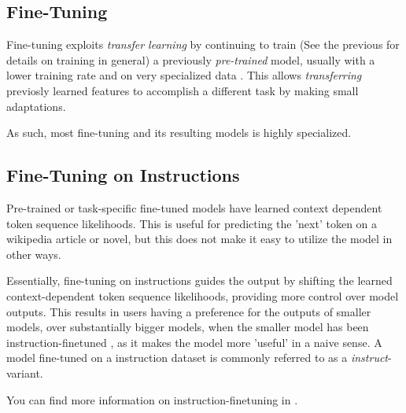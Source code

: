 \subsection{Fine-Tuning}\label{sub:finetune}
Fine-tuning exploits \textit{transfer learning} by continuing to train (See the previous  for details on training in general) a previously \textit{pre-trained} model, usually with a lower training rate and on very specialized data \cite{gaddipati_comparative_2020}.
This allows \textit{transferring} previosly learned features to accomplish a different task by making small adaptations.

As such, most fine-tuning and its resulting models is highly specialized.

\subsection{Fine-Tuning on Instructions}\label{sub:instruct}
Pre-trained or task-specific fine-tuned  models have learned context dependent token sequence likelihoods.
This is useful for predicting the 'next' token on a wikipedia article or novel, but this does not make it easy to utilize the model in other ways.

Essentially, fine-tuning on instructions guides the output by shifting the learned context-dependent token sequence likelihoods, providing more control over model outputs.
This results in users having a preference for the outputs of smaller models, over substantially bigger models, when the smaller model has been instruction-finetuned \cite{ouyang_training_2022}, as it makes the model more 'useful' in a naive sense.
A model fine-tuned on  a instruction dataset is commonly referred to as a \textit{instruct}-variant.

You can find more information on instruction-finetuning in \cite{ouyang_training_2022, tirumala_d4_2023}.


